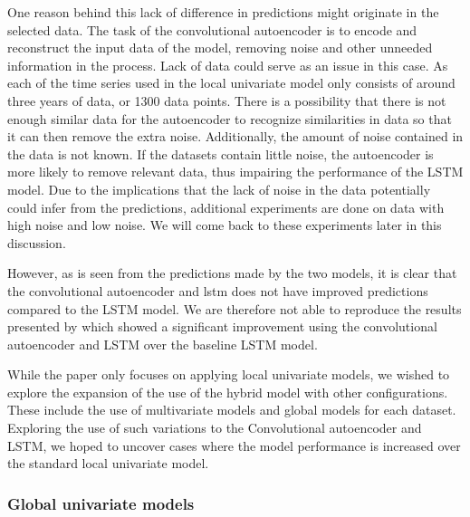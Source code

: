 One reason behind this lack of difference in predictions might originate in the selected data.
The task of the convolutional autoencoder is to encode and reconstruct the input data of the model,
removing noise and other unneeded information in the process.
Lack of data could serve as an issue in this case.
As each of the time series used in the local univariate model only consists of around three years of data, or 1300 data points.
There is a possibility that there is not enough similar data for the autoencoder to recognize similarities in data
so that it can then remove the extra noise.
Additionally, the amount of noise contained in the data is not known.
If the datasets contain little noise, the autoencoder is more likely to remove relevant data, thus impairing the performance of the LSTM model.
Due to the implications that the lack of noise in the data potentially could infer from the predictions,
additional experiments are done on data with high noise and low noise.
We will come back to these experiments later in this discussion.

However, as is seen from the predictions made by the two models, it is clear that the convolutional autoencoder and lstm
does not have improved predictions compared to the LSTM model.
We are therefore not able to reproduce the results presented by \cite{Zhao2019}
which showed a significant improvement using the convolutional autoencoder and LSTM over the baseline LSTM model.


While the paper \cite{Zhao2019} only focuses on applying local univariate models,
we wished to explore the expansion of the use of the hybrid model with other configurations.
These include the use of multivariate models and global models for each dataset.
Exploring the use of such variations to the Convolutional autoencoder and LSTM,
we hoped to uncover cases where the model performance is increased over the standard local univariate model.



\subsubsection{Global univariate models}


